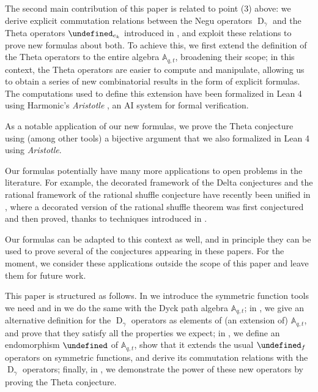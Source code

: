\documentclass[reqno]{amsart}
\theoremstyle{plain}
\theoremstyle{definition}
\theoremstyle{remark}
\DeclareMathOperator{\D}{D}
\newcommand{\A}{\mathbb{A}}%
\let\oldTheta\Theta
\let\Theta\undefined
\DeclareMathOperator{\Theta}{\oldTheta}
\newcommand{\<}{\langle}
\renewcommand{\>}{\rangle}
\begin{document}
The second main contribution of this paper is related to point (3) above: we derive explicit commutation relations between the Negu operators $\D_\gamma$ and the Theta operators $\Theta_{e_k}$ introduced in \cite{DAdderioIraciVandenWyngaerd2021ThetaOperators}, and exploit these relations to prove new formulas about both. To achieve this, we first extend the definition of the Theta operators to the entire algebra $\A_{q,t}$, broadening their scope; in this context, the Theta operators are easier to compute and manipulate, allowing us to obtain a series of new combinatorial results in the form of explicit formulas. The computations used to define this extension have been formalized in Lean 4 using Harmonic's \emph{Aristotle} \cite{Achim2025Aristotle}, an AI system for formal verification.

As a notable application of our new formulas, we prove the Theta conjecture \cite[Conjecture~9.1]{DAdderioIraciVandenWyngaerd2021ThetaOperators} using (among other tools) a bijective argument that we also formalized in Lean 4 using \emph{Aristotle}.

Our formulas potentially have many more applications to open problems in the literature. For example, the decorated framework of the Delta conjectures and the rational framework of the rational shuffle conjecture have recently been unified in \cite{IraciPagariaPaolini2026FallingStars}, where a decorated version of the rational shuffle theorem was first conjectured and then proved, thanks to techniques introduced in \cite{GillespieGorskyGriffin2025Skewing}.

Our formulas can be adapted to this context as well, and in principle they can be used to prove several of the conjectures appearing in these papers. For the moment, we consider these applications outside the scope of this paper and leave them for future work.

This paper is structured as follows. In  we introduce the symmetric function tools we need and in  we do the same with the Dyck path algebra $\A_{q,t}$; in , we give an alternative definition for the $\D_\gamma$ operators as elements of (an extension of) $\A_{q,t}$, and prove that they satisfy all the properties we expect; in , we define an endomorphism $\Theta$ of $\A_{q,t}$, show that it extends the usual $\Theta_f$ operators on symmetric functions, and derive its commutation relations with the $\D_\gamma$ operators; finally, in , we demonstrate the power of these new operators by proving the Theta conjecture.
\end{document}
